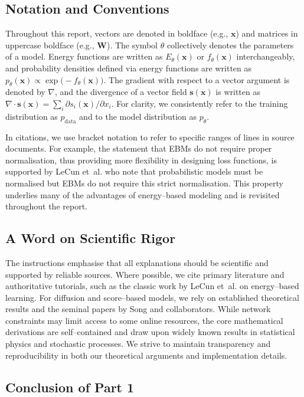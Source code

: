 \subsection{Notation and Conventions}

Throughout this report, vectors are denoted in boldface (e.g., $\mathbf{x}$)
and matrices in uppercase boldface (e.g., $\mathbf{W}$).  The symbol $\theta$
collectively denotes the parameters of a model.  Energy functions are
written as $E_\theta(\mathbf{x})$ or $f_\theta(\mathbf{x})$ interchangeably, and
probability densities defined via energy functions are written as
$p_\theta(\mathbf{x}) \propto \exp\big(-f_\theta(\mathbf{x})\big)$.  The gradient
with respect to a vector argument is denoted by $\nabla$, and the
divergence of a vector field $\mathbf{s}(\mathbf{x})$ is written as
$\nabla \cdot \mathbf{s}(\mathbf{x}) = \sum_i \partial s_i(\mathbf{x}) / \partial x_i$.
For clarity, we consistently refer to the training distribution as
$p_{\text{data}}$ and to the model distribution as $p_\theta$.

In citations, we use bracket notation to refer to specific ranges of lines in
source documents.  For example, the statement that EBMs do not require
proper normalisation, thus providing more flexibility in designing loss
functions, is supported by LeCun et~al. who note that probabilistic models
must be normalised but EBMs do not require this strict normalisation. This
property underlies many of the advantages of energy–based modeling and is
revisited throughout the report.

\subsection{A Word on Scientific Rigor}

The instructions emphasise that all explanations should be scientific and
supported by reliable sources.  Where possible, we cite primary literature
and authoritative tutorials, such as the classic work by LeCun et~al. on
energy–based learning.  For diffusion and score–based models,
we rely on established theoretical results and the seminal papers by Song
and collaborators.  While network constraints may limit access to some
online resources, the core mathematical derivations are self–contained and
draw upon widely known results in statistical physics and stochastic
processes.  We strive to maintain transparency and reproducibility in both
our theoretical arguments and implementation details.

\subsection{Conclusion of Part 1}

